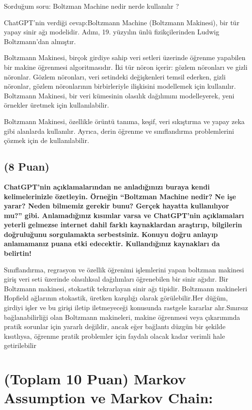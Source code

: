 \documentclass[11pt]{article}
\begin{document}
\item Sorduğum soru: Boltzman Machine nedir nerde kullanılır ?
\item ChatGPT'nin verdiği cevap:Boltzmann Machine (Boltzmann Makinesi), bir tür yapay sinir ağı modelidir. Adını, 19. yüzyılın ünlü fizikçilerinden Ludwig Boltzmann'dan almıştır.

Boltzmann Makinesi, birçok girdiye sahip veri setleri üzerinde öğrenme yapabilen bir makine öğrenmesi algoritmasıdır. İki tür nöron içerir: gözlem nöronları ve gizli nöronlar. Gözlem nöronları, veri setindeki değişkenleri temsil ederken, gizli nöronlar, gözlem nöronlarının birbirleriyle ilişkisini modellemek için kullanılır. Boltzmann Makinesi, bir veri kümesinin olasılık dağılımını modelleyerek, yeni örnekler üretmek için kullanılabilir.

Boltzmann Makinesi, özellikle örüntü tanıma, keşif, veri sıkıştırma ve yapay zeka gibi alanlarda kullanılır. Ayrıca, derin öğrenme ve sınıflandırma problemlerini çözmek için de kullanılabilir.

\subsection{(8 Puan)} \textbf{ChatGPT’nin açıklamalarından ne anladığınızı buraya kendi kelimelerinizle özetleyin. Örneğin ``Boltzman Machine nedir? Ne işe yarar? Neden bilmemiz gerekir bunu? Gerçek hayatta kullanılıyor mu?'' gibi. Anlamadığınız kısımlar varsa ve ChatGPT’nin açıklamaları yeterli gelmezse internet dahil farklı kaynaklardan araştırıp, bilgilerin doğruluğunu sorgulamakta serbestsiniz. Konuyu doğru anlayıp anlamamanız puana etki edecektir. Kullandığınız kaynakları da belirtin!}

Sınıflandırma, regrasyon ve özellik öğrenimi işlemlerini yapan boltzman makinesi giriş veri seti üzerinde olasılıksal dağılımları öğrenebilen bir sinir ağıdır. Bir Boltzmann makinesi, stokastik tekrarlayan sinir ağı tipidir. Boltzmann makineleri Hopfield ağlarının stokastik, üretken karşılığı olarak görülebilir.Her düğüm, girdiyi işler ve bu girişi iletip iletmeyeceği konusunda rastgele kararlar alır.Sınırsız bağlanabilirliği olan Boltzmann makineleri, makine öğrenmesi veya çıkarımında pratik sorunlar için yararlı değildir, ancak eğer bağlantı düzgün bir şekilde kısıtlıysa, öğrenme pratik problemler için faydalı olacak kadar verimli hale getirilebilir

\section{(Toplam 10 Puan) Markov Assumption ve Markov Chain:}
\end{document}
